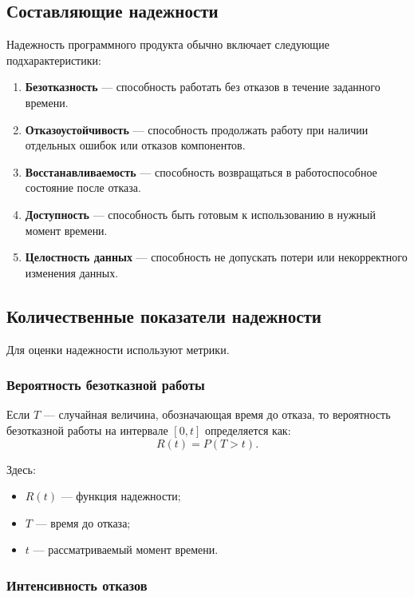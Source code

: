 \documentclass[12pt,a4paper]{article}
\begin{document}
\subsection{Составляющие надежности}

Надежность программного продукта обычно включает следующие подхарактеристики:

\begin{enumerate}
    \item \textbf{Безотказность} --- способность работать без отказов в течение заданного времени.
    \item \textbf{Отказоустойчивость} --- способность продолжать работу при наличии отдельных ошибок или отказов компонентов.
    \item \textbf{Восстанавливаемость} --- способность возвращаться в работоспособное состояние после отказа.
    \item \textbf{Доступность} --- способность быть готовым к использованию в нужный момент времени.
    \item \textbf{Целостность данных} --- способность не допускать потери или некорректного изменения данных.
\end{enumerate}

\subsection{Количественные показатели надежности}

Для оценки надежности используют метрики.

\subsubsection{Вероятность безотказной работы}

Если $T$ --- случайная величина, обозначающая время до отказа, то вероятность безотказной работы на интервале $[0,t]$ определяется как:
\[
R(t) = P(T > t).
\]

Здесь:
\begin{itemize}
    \item $R(t)$ --- функция надежности;
    \item $T$ --- время до отказа;
    \item $t$ --- рассматриваемый момент времени.
\end{itemize}

\subsubsection{Интенсивность отказов}
\end{document}
